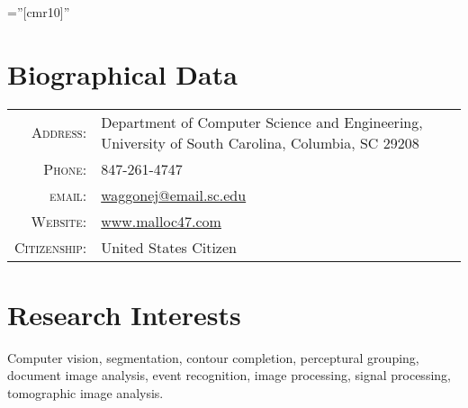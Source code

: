 \documentclass[a4paper,10pt]{article}
\begin{document}
\pagestyle{empty} %

\font\fb=''[cmr10]'' %

\par{\bigskip\par}

\section{Biographical Data}

\begin{tabular}{r p{3.5in}}
	\textsc{Address:}	& Department of Computer Science and Engineering, University of South Carolina, Columbia, SC 29208 \\
    \textsc{Phone:}     & 847-261-4747\\
    \textsc{email:}     & \href{mailto:waggonej@email.sc.edu}{waggonej@email.sc.edu} \\
	\textsc{Website:}	& \href{http://www.malloc47.com}{www.malloc47.com} \\
	\textsc{Citizenship:} & United States Citizen \\
\end{tabular}

\section{Research Interests}

Computer vision, segmentation, contour completion, perceptural grouping, document image analysis, event recognition, image processing, signal processing, tomographic image analysis.
\end{document}
